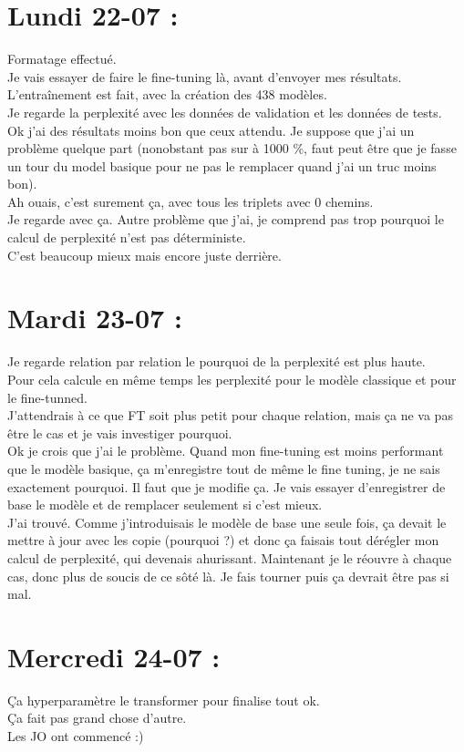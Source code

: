 \documentclass{article}
\begin{document}
\section*{Lundi 22-07 :}
Formatage effectué.\\
Je vais essayer de faire le fine-tuning là, avant d'envoyer mes résultats.\\
L'entraînement est fait, avec la création des 438 modèles.\\
Je regarde la perplexité avec les données de validation et les données de tests.\\
Ok j'ai des résultats moins bon que ceux attendu. Je suppose que j'ai un problème quelque part (nonobstant pas sur à 1000 \%, faut peut être que je fasse un tour du model basique pour ne pas le remplacer quand j'ai un truc moins bon).\\
Ah ouais, c'est surement ça, avec tous les triplets avec 0 chemins.\\
Je regarde avec ça. Autre problème que j'ai, je comprend pas trop pourquoi le calcul de perplexité n'est pas déterministe.\\
C'est beaucoup mieux mais encore juste derrière.\\
\section*{Mardi 23-07 :}
Je regarde relation par relation le pourquoi de la perplexité est plus haute.\\
Pour cela calcule en même temps les perplexité pour le modèle classique et pour le fine-tunned.\\
J'attendrais à ce que FT soit plus petit pour chaque relation, mais ça ne va pas être le cas et je vais investiger pourquoi.\\
Ok je crois que j'ai le problème. Quand mon fine-tuning est moins performant que le modèle basique, ça m'enregistre tout de même le fine tuning, je ne sais exactement pourquoi. Il faut que je modifie ça. Je vais essayer d'enregistrer de base le modèle et de remplacer seulement si c'est mieux.\\
J'ai trouvé. Comme j'introduisais le modèle de base une seule fois, ça devait le mettre à jour avec les copie (pourquoi ?) et donc ça faisais tout dérégler mon calcul de perplexité, qui devenais ahurissant. Maintenant je le réouvre à chaque cas, donc plus de soucis de ce sôté là. Je fais tourner puis ça devrait être pas si mal.\\
\section*{Mercredi 24-07 :}
Ça hyperparamètre le transformer pour finalise tout ok.\\
Ça fait pas grand chose d'autre.\\
Les JO ont commencé :)\\
\end{document}
